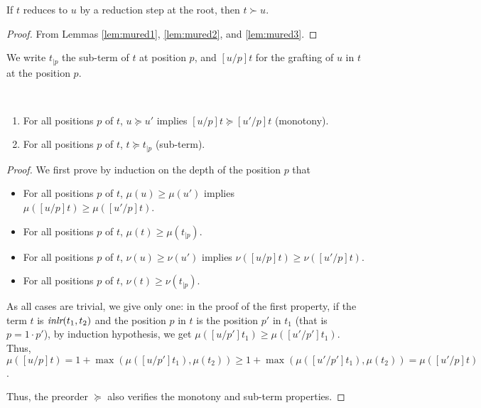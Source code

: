 \documentclass[screen, sigconf,authorversion,nonacm]{acmart}
\theoremstyle{acmdefinition}
\numberwithin{equation}{section}
\newcommand\inlr{\mbox{\it inlr}}
\begin{document}
\begin{lemma}\label{lex}
If $t$
reduces to $u$ by a reduction step at the root, then
$t \succ u$.
\end{lemma}

\begin{proof}
From Lemmas \ref{lem:mured1}, \ref{lem:mured2}, and
\ref{lem:mured3}. \qedhere
\end{proof}

We write $t_{|p}$ the sub-term of $t$ at position $p$, and $[u/p]t$ for the
grafting of $u$ in $t$ at the position $p$.

\begin{lemma}[Simplification]
  \label{lem:simplification}~
  \begin{enumerate}
    \item For all positions $p$ of $t$, $u\succcurlyeq u'$ implies
      $[u/p]t \succcurlyeq [u'/p]t$ (monotony).
    \item For all positions $p$ of $t$, $t \succcurlyeq t_{|p}$ (sub-term).
  \end{enumerate}
\end{lemma}
\begin{proof}
  We first prove by induction on the depth of the position $p$ that 
  \begin{itemize}
    \item For all positions $p$ of $t$, $\mu(u) \geq \mu(u')$ implies
      $\mu([u/p]t) \geq \mu([u'/p]t)$.

    \item For all positions $p$ of $t$, $\mu(t) \geq \mu(t_{|p})$. 

    \item For all positions $p$ of $t$, $\nu(u) \geq \nu(u')$ implies
      $\nu([u/p]t) \geq \nu([u'/p]t)$.

    \item For all positions $p$ of $t$, $\nu(t) \geq \nu(t_{|p})$. 
  \end{itemize}

  As all cases are trivial, we give only one: in the proof of the first
  property, if the term $t$ is $\inlr(t_1,t_2)$ and the position $p$ in $t$
  is the position $p'$ in $t_1$ (that is $p = 1 \cdot p'$), by induction
  hypothesis, we get
  $\mu([u/p']t_1) \geq \mu([u'/p']t_1)$.
  Thus,
  $\mu([u/p]t) = 1 + \max(\mu([u/p']t_1),\mu(t_2)) \geq
  1 + \max(\mu([u'/p']t_1),\mu(t_2))
  = \mu([u'/p]t)$.

  Thus, the preorder $\succcurlyeq$ also verifies the monotony and sub-term
  properties. \qedhere
\end{proof}
\end{document}
